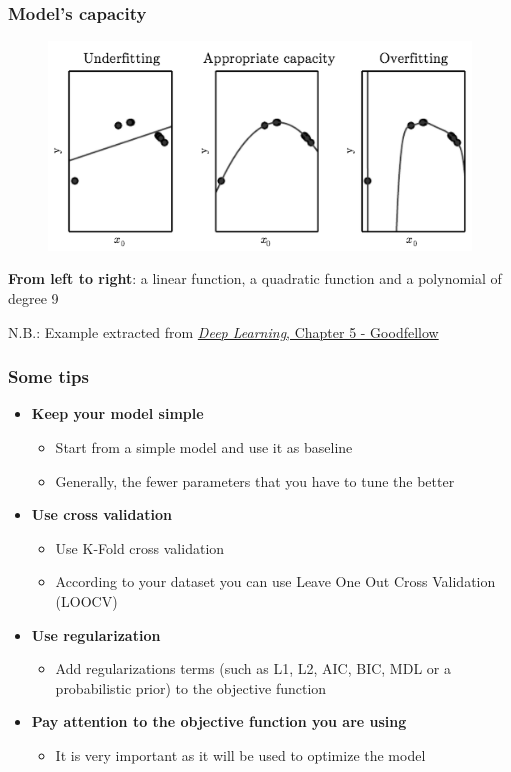 \documentclass{beamer}
\begin{document}
\begin{frame}\frametitle{Model's capacity}
\begin{figure}[h]
	\centering
	\includegraphics[scale=0.42]{./Figures/model_capacity}
	\label{fig:model_capacity}
\end{figure}
{\bf From left to right}: a linear function, a quadratic function and a polynomial of degree 9

\vspace{1em}
N.B.: Example extracted from \href{http://www.deeplearningbook.org/}{\textit{Deep Learning}, Chapter 5 - Goodfellow}
\end{frame}

\begin{frame}\frametitle{Some tips}
\begin{itemize}
	\setlength\itemsep{1em}
	\item {\bf Keep your model simple}
	\begin{itemize}
		\item Start from a simple model and use it as baseline
		\item Generally, the fewer parameters that you have to tune the better
	\end{itemize}
	\item {\bf Use cross validation}
	\begin{itemize}
		\item Use K-Fold cross validation
		\item According to your dataset you can use Leave One Out Cross Validation (LOOCV)
	\end{itemize}
	\item {\bf Use regularization}
	\begin{itemize}
		\item Add regularizations terms (such as L1, L2, AIC, BIC, MDL or a probabilistic prior) to the objective function
	\end{itemize}
	\item {\bf Pay attention to the objective function you are using}
	\begin{itemize}
		\item It is very important as it will be used to optimize the model
	\end{itemize}
\end{itemize}
\end{frame}
\end{document}
